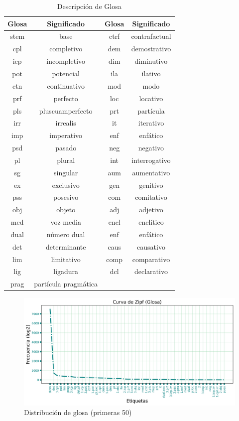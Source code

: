 \documentclass[letterpaper,12pt,oneside]{book}
\theoremstyle{definition}
\begin{document}
\begin{table}
	\centering
	\begin{tabular}{| c  c | c  c |} \hline
		\textbf{Glosa} & \textbf{Significado} & \textbf{Glosa} & \textbf{Significado}\\\hline
		stem & base & ctrf & contrafactual \\
        cpl & completivo & dem & demostrativo \\
        icp & incompletivo & dim & diminutivo \\
        pot & potencial & ila & ilativo \\
        ctn & continuativo & mod & modo \\
        prf & perfecto & loc & locativo \\
        pls & pluscuamperfecto & prt & partícula \\
        irr & irrealis & it & iterativo \\
        imp & imperativo & enf & enfático \\
        psd & pasado & neg & negativo \\
        pl & plural & int & interrogativo \\
        sg & singular & aum & aumentativo \\
        ex & exclusivo & gen & genitivo \\
        pss & posesivo & com & comitativo \\
        obj & objeto & adj & adjetivo \\
        med & voz media & encl & enclítico \\
        dual & número dual & enf & enfático \\
        det & determinante & caus & causativo \\
        lim & limitativo & comp & comparativo \\
        lig & ligadura & dcl & declarativo \\
        prag & partícula pragmática & \\ \hline
	\end{tabular}
	\caption{Descripción de Glosa}
	\label{table:gloss_desc}
\end{table}
	

\begin{figure}
	\centering
	\includegraphics[width=\textwidth]{zipf_gloss}
	\caption{Distribución de glosa (primeras 50)}
	\label{fig:gloss_distrib}
\end{figure}
\end{document}
